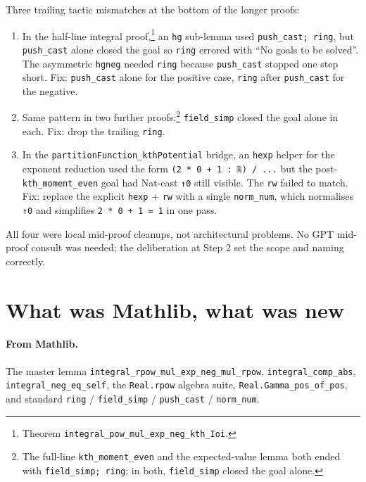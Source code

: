 \documentclass[11pt]{article}
\begin{document}
Three trailing tactic mismatches at the bottom of the longer proofs:

\begin{enumerate}[leftmargin=1.5em]
\item In the half-line integral proof,\footnote{Theorem
  \texttt{integral\_pow\_mul\_exp\_neg\_kth\_Ioi}.} an \texttt{hg}
  sub-lemma used \texttt{push\_cast; ring}, but \texttt{push\_cast}
  alone closed the goal so \texttt{ring} errored with ``No goals to
  be solved''. The asymmetric \texttt{hgneg} needed \texttt{ring}
  because \texttt{push\_cast} stopped one step short. Fix:
  \texttt{push\_cast} alone for the positive case, \texttt{ring}
  after \texttt{push\_cast} for the negative.
\item Same pattern in two further proofs:\footnote{The full-line
  \texttt{kth\_moment\_even} and the expected-value lemma both ended
  with \texttt{field\_simp; ring}; in both, \texttt{field\_simp}
  closed the goal alone.} \texttt{field\_simp} closed the goal
  alone in each. Fix: drop the trailing \texttt{ring}.
\item In the \texttt{partitionFunction\_kthPotential} bridge, an
  \texttt{hexp} helper for the exponent reduction used the form
  \texttt{(2 * 0 + 1 : ℝ) / ...} but the post-\texttt{kth\_moment\_even}
  goal had Nat-cast \texttt{↑0} still visible. The \texttt{rw}
  failed to match. Fix: replace the explicit \texttt{hexp} +
  \texttt{rw} with a single \texttt{norm\_num}, which normalises
  \texttt{↑0} and simplifies \texttt{2 * 0 + 1 = 1} in one pass.
\end{enumerate}

All four were local mid-proof cleanups, not architectural problems.
No GPT mid-proof consult was needed; the deliberation at Step 2 set
the scope and naming correctly.

\section{What was Mathlib, what was new}

\paragraph{From Mathlib.} The master lemma
\texttt{integral\_rpow\_mul\_exp\_neg\_mul\_rpow},
\texttt{integral\_comp\_abs}, \texttt{integral\_neg\_eq\_self}, the
\texttt{Real.rpow} algebra suite, \texttt{Real.Gamma\_pos\_of\_pos},
and standard \texttt{ring} / \texttt{field\_simp} /
\texttt{push\_cast} / \texttt{norm\_num}.
\end{document}
